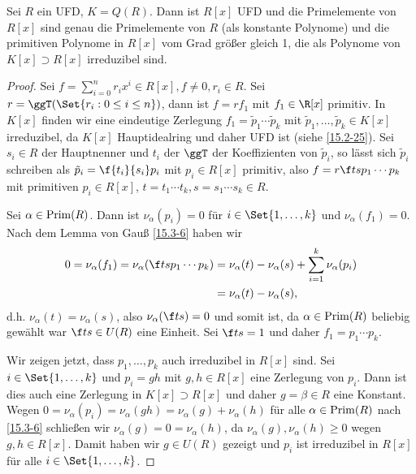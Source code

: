 \begin{st} \label{15.3-8}
	Sei $R$ ein UFD, $K = Q(R)$.
	Dann ist $R[x]$ UFD und die Primelemente von $R[x]$ sind genau die Primelemente von $R$ (als konstante Polynome) und die primitiven Polynome in $R[x]$ vom Grad größer gleich 1, die als Polynome von $K[x] \supset R[x]$ irreduzibel sind.
	\begin{proof}
		Sei $f = \sum_{i=0}^n r_i x^i \in R[x], f \neq 0, r_i \in R$.
		Sei $r = \ggT(\Set{r_i : 0 \le i \le n})$, dann ist $f = r f_1$ mit $f_1 \in \R[x]$ primitiv.
		In $K[x]$ finden wir eine eindeutige Zerlegung $f_1 = \tilde p_1 \dotsb \tilde p_k$ mit $\tilde p_1, \dotsc, \tilde p_k \in K[x]$ irreduzibel, da $K[x]$ Hauptidealring und daher UFD ist (siehe \ref{15.2-25}).
		Sei $s_i \in R$ der Hauptnenner und $t_i$ der $\ggT$ der Koeffizienten von $\tilde p_i$, so lässt sich $\tilde p_i$ schreiben als $\tilde p_i = \f{t_i}{s_i} p_i$ mit $p_i \in R[x]$ primitiv, also $f = r \f ts p_1 \dotsb p_k$ mit primitiven $p_i \in R[x]$, $t = t_1 \dotsb t_k, s = s_1 \dotsb s_k \in R$.

		Sei $\alpha \in \operatorname{Prim}(R)$.
		Dann ist $\nu_\alpha(p_i) = 0$ für $i \in \Set{1, \dotsc, k}$ und $\nu_\alpha(f_1) = 0$.
		Nach dem Lemma von Gauß \ref{15.3-6} haben wir
		\begin{align*}
			0 = \nu_\alpha(f_1)
			= \nu_\alpha(\f ts p_1 \dotsb p_k)
			&= \nu_\alpha(t) - \nu_\alpha(s) + \sum_{i=1}^k \nu_\alpha(p_i) \\
			&= \nu_\alpha(t) - \nu_\alpha(s),
		\end{align*}
		d.h. $\nu_\alpha(t) = \nu_\alpha(s)$, also $\nu_\alpha(\f ts) = 0$ und somit ist, da $\alpha \in \operatorname{Prim}(R)$ beliebig gewählt war $\f ts \in U(R)$ eine Einheit.
		Sei \oBdA $\f ts = 1$ und daher $f_1 = p_1 \dotsb p_k$.

		Wir zeigen jetzt, dass $p_1, \dotsc, p_k$ auch irreduzibel in $R[x]$ sind.
		Sei $i \in \Set{1, \dotsc, k}$ und $p_i = gh$ mit $g, h \in R[x]$ eine Zerlegung von $p_i$.
		Dann ist dies auch eine Zerlegung in $K[x] \supset R[x]$ und daher \oBdA $g = \beta \in R$ eine Konstant.
		Wegen $0 = \nu_\alpha(p_i) = \nu_\alpha(gh) = \nu_\alpha(g) + \nu_\alpha(h)$ für alle $\alpha \in \operatorname{Prim}(R)$ nach \ref{15.3-6} schließen wir $\nu_\alpha(g) = 0 = \nu_\alpha(h)$, da $\nu_\alpha(g), \nu_\alpha(h) \ge 0$ wegen $g, h \in R[x]$.
		Damit haben wir $g \in U(R)$ gezeigt und $p_i$ ist irreduzibel in $R[x]$ für alle $i \in \Set{1,\dotsc, k}$.


\end{proof}
\end{st}
